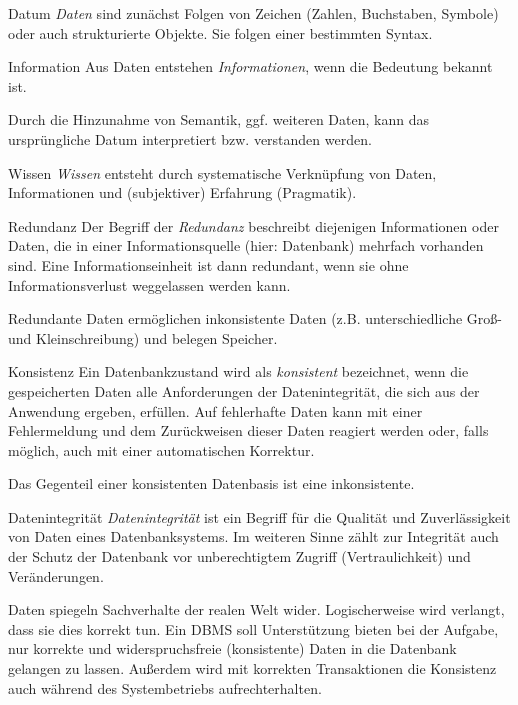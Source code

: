 \begin{bonus}{Datum}
    \emph{Daten} sind zunächst Folgen von Zeichen (Zahlen, Buchstaben, Symbole) oder auch strukturierte Objekte.
    Sie folgen einer bestimmten Syntax.
\end{bonus}

\begin{bonus}{Information}
    Aus Daten entstehen \emph{Informationen}, wenn die Bedeutung bekannt ist.

    Durch die Hinzunahme von Semantik, ggf. weiteren Daten, kann das ursprüngliche Datum interpretiert bzw. verstanden werden.
\end{bonus}

\begin{bonus}{Wissen}
    \emph{Wissen} entsteht durch systematische Verknüpfung von Daten, Informationen und (subjektiver) Erfahrung (Pragmatik).
\end{bonus}

\begin{defi}{Redundanz}
    Der Begriff der \emph{Redundanz} beschreibt diejenigen Informationen oder Daten, die in einer Informationsquelle (hier: Datenbank) mehrfach vorhanden sind.
    Eine Informationseinheit ist dann redundant, wenn sie ohne Informationsverlust weggelassen werden kann.

    Redundante Daten ermöglichen inkonsistente Daten (z.B. unterschiedliche Groß- und Kleinschreibung) und belegen Speicher.
\end{defi}

\begin{defi}{Konsistenz}
    Ein Datenbankzustand wird als \emph{konsistent} bezeichnet, wenn die gespeicherten Daten alle Anforderungen der Datenintegrität, die sich aus der Anwendung ergeben, erfüllen.
    Auf fehlerhafte Daten kann mit einer Fehlermeldung und dem Zurückweisen dieser Daten reagiert werden oder, falls möglich, auch mit einer automatischen Korrektur.

    Das Gegenteil einer konsistenten Datenbasis ist eine inkonsistente.
\end{defi}

\begin{defi}{Datenintegrität}
    \emph{Datenintegrität} ist ein Begriff für die Qualität und Zuverlässigkeit von Daten eines Datenbanksystems.
    Im weiteren Sinne zählt zur Integrität auch der Schutz der Datenbank vor unberechtigtem Zugriff (Vertraulichkeit) und Veränderungen.

    Daten spiegeln Sachverhalte der realen Welt wider.
    Logischerweise wird verlangt, dass sie dies korrekt tun.
    Ein DBMS soll Unterstützung bieten bei der Aufgabe, nur korrekte und widerspruchsfreie (konsistente) Daten in die Datenbank gelangen zu lassen.
    Außerdem wird mit korrekten Transaktionen die Konsistenz auch während des Systembetriebs aufrechterhalten.
\end{defi}

